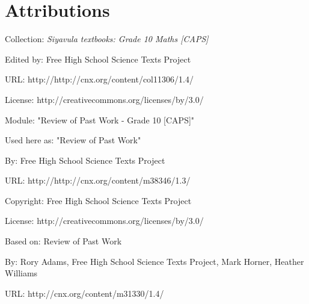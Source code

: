 \chapter{Attributions}\def\leftmark{ATTRIBUTIONS}\def\rightmark{ATTRIBUTIONS}\label{col11306*Attributions}\vspace{.3cm}\begin{minipage}{\textwidth}
    Collection: \textsl{Siyavula textbooks: Grade 10 Maths [CAPS]}\par\nopagebreak\noindent
    Edited by: Free High School Science Texts Project\par\nopagebreak\noindent
    URL: http://http://cnx.org/content/col11306/1.4/\par\nopagebreak\noindent
    License: http://creativecommons.org/licenses/by/3.0/\par
    \end{minipage}
    \par\vspace{9pt}\noindent\begin{minipage}{\textwidth}
      Module: "Review of Past Work - Grade 10 [CAPS]" \par\nopagebreak\noindent
      Used here as: "Review of Past Work" \par\nopagebreak\noindent
        By: Free High School Science Texts Project\par\nopagebreak\noindent
      URL: http://http://cnx.org/content/m38346/1.3/\par\nopagebreak\noindent
      \par\nopagebreak\noindent
      Copyright: Free High School Science Texts Project\par\nopagebreak\noindent
      License:  http://creativecommons.org/licenses/by/3.0/\par\nopagebreak\noindent
      Based on: Review of Past Work\par\nopagebreak\noindent
        By: Rory Adams, Free High School Science Texts Project, Mark Horner, Heather Williams\par\nopagebreak\noindent
        URL: http://cnx.org/content/m31330/1.4/
        \par\end{minipage}
